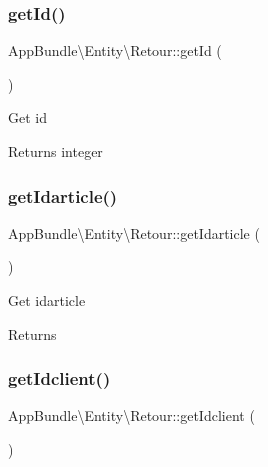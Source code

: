 \subsubsection{\texorpdfstring{get\+Id()}{getId()}}
{\footnotesize\ttfamily App\+Bundle\textbackslash{}\+Entity\textbackslash{}\+Retour\+::get\+Id (\begin{DoxyParamCaption}{ }\end{DoxyParamCaption})}

Get id

\begin{DoxyReturn}{Returns}
integer 
\end{DoxyReturn}
\mbox{\label{class_app_bundle_1_1_entity_1_1_retour_a188d35bf9fef6b6032ce58dadc5f0cae}} 
\subsubsection{\texorpdfstring{get\+Idarticle()}{getIdarticle()}}
{\footnotesize\ttfamily App\+Bundle\textbackslash{}\+Entity\textbackslash{}\+Retour\+::get\+Idarticle (\begin{DoxyParamCaption}{ }\end{DoxyParamCaption})}

Get idarticle

\begin{DoxyReturn}{Returns}

\end{DoxyReturn}
\mbox{\label{class_app_bundle_1_1_entity_1_1_retour_a3ecb8b4e4903a7e314b4d8f701ce8954}} 
\subsubsection{\texorpdfstring{get\+Idclient()}{getIdclient()}}
{\footnotesize\ttfamily App\+Bundle\textbackslash{}\+Entity\textbackslash{}\+Retour\+::get\+Idclient (\begin{DoxyParamCaption}{ }\end{DoxyParamCaption})}


